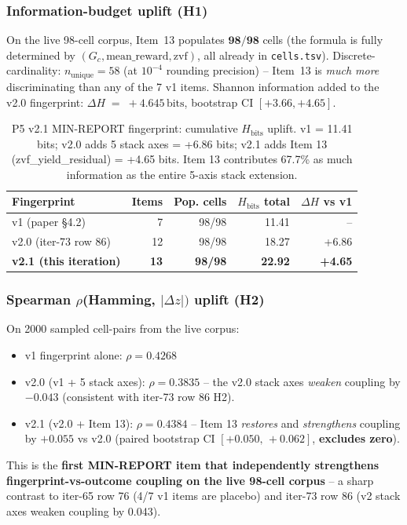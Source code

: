 \documentclass{article}  \usepackage[preprint,nonatbib]{neurips_2026} \usepackage[numbers]{natbib}
\begin{document}
\subsubsection{Information-budget uplift (H1)}
On the live 98-cell corpus, Item~13 populates $\mathbf{98/98}$ cells (the
formula is fully determined by $(G_c, \mathrm{mean\_reward}, \mathrm{zvf})$,
all already in \texttt{cells.tsv}). Discrete-cardinality:
$n_{\mathrm{unique}} = 58$ (at $10^{-4}$ rounding precision) -- Item~13 is
\emph{much more} discriminating than any of the 7 v1 items. Shannon
information added to the v2.0 fingerprint:
$\Delta H \;=\; +4.645\,\mathrm{bits}$, bootstrap CI $[+3.66, +4.65]$.

\begin{table}[ht]
\centering
\small
\caption{P5 v2.1 MIN-REPORT fingerprint: cumulative $H_{\mathrm{bits}}$ uplift.
v1 = 11.41 bits; v2.0 adds 5 stack axes = +6.86 bits; v2.1 adds Item 13
(zvf\_yield\_residual) = +4.65 bits. Item 13 contributes 67.7\% as much
information as the entire 5-axis stack extension.}
\label{tab:p5-v21-uplift}
\begin{tabular}{l r r r r}
\toprule
Fingerprint & Items & Pop. cells & $H_{\mathrm{bits}}$ total & $\Delta H$ vs v1 \\
\midrule
v1 (paper §4.2)        & 7 & 98/98 & 11.41 & -- \\
v2.0 (iter-73 row 86)  & 12 & 98/98 & 18.27 & +6.86 \\
\textbf{v2.1 (this iteration)} & \textbf{13} & \textbf{98/98} & \textbf{22.92} & \textbf{+4.65} \\
\bottomrule
\end{tabular}
\end{table}

\subsubsection{Spearman $\rho$(Hamming, $|\Delta z|)$ uplift (H2)}
On 2000 sampled cell-pairs from the live corpus:
\begin{itemize}
  \item v1 fingerprint alone: $\rho = 0.4268$
  \item v2.0 (v1 + 5 stack axes): $\rho = 0.3835$ -- the v2.0 stack axes
        \emph{weaken} coupling by $-0.043$ (consistent with iter-73 row 86 H2).
  \item v2.1 (v2.0 + Item 13): $\rho = 0.4384$ -- Item 13 \emph{restores} and
        \emph{strengthens} coupling by $+0.055$ vs v2.0 (paired bootstrap CI
        $[+0.050,\,+0.062]$, \textbf{excludes zero}).
\end{itemize}
This is the \textbf{first MIN-REPORT item that independently strengthens
fingerprint-vs-outcome coupling on the live 98-cell corpus} -- a sharp
contrast to iter-65 row 76 (4/7 v1 items are placebo) and iter-73 row 86
(v2 stack axes weaken coupling by 0.043).
\end{document}
